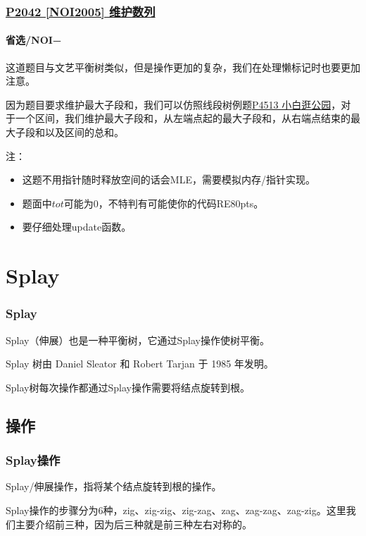 \documentclass[utf8]{ctexbeamer}
\begin{document}
    \begin{frame}
        \frametitle{\href{https://www.luogu.com.cn/problem/P2042}{P2042 [NOI2005] 维护数列}}
        \framesubtitle{\textcolor[RGB]{157,61,207}{省选/NOI−}}
        这道题目与文艺平衡树类似，但是操作更加的复杂，我们在处理懒标记时也要更加注意。

        因为题目要求维护最大子段和，我们可以仿照线段树例题\href{https://www.luogu.com.cn/problem/P4513}{P4513 小白逛公园}，对于一个区间，我们维护最大子段和，从左端点起的最大子段和，从右端点结束的最大子段和以及区间的总和。

        注：
        \begin{itemize}
            \item 这题不用指针随时释放空间的话会MLE，需要模拟内存/指针实现。
            \item 题面中$tot$可能为$0$，不特判有可能使你的代码RE80pts。
            \item 要仔细处理update函数。
        \end{itemize}
        
    \end{frame}

    \section{Splay}

    \begin{frame}
        \frametitle{Splay}
        Splay（伸展）也是一种平衡树，它通过Splay操作使树平衡。

        Splay 树由 Daniel Sleator 和 Robert Tarjan 于 1985 年发明。

        Splay树每次操作都通过Splay操作需要将结点旋转到根。 
    \end{frame}

    \subsection{操作}

    \begin{frame}
        \frametitle{Splay操作}
        Splay/伸展操作，指将某个结点旋转到根的操作。

        Splay操作的步骤分为6种，zig、zig-zig、zig-zag、zag、zag-zag、zag-zig。这里我们主要介绍前三种，因为后三种就是前三种左右对称的。  
    \end{frame}
\end{document}

